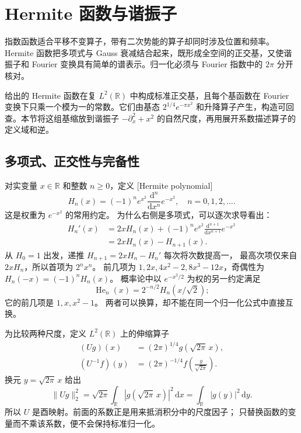 \section{Hermite 函数与谐振子}
\label{b2:sec:B201}

指数函数适合平移不变算子，带有二次势能的算子却同时涉及位置和频率。Hermite 函数把多项式与 Gauss 衰减结合起来，既形成全空间的正交基，又使谐振子和 Fourier 变换具有简单的谱表示。归一化必须与 Fourier 指数中的 \(2\pi\) 分开核对。

\ProseParagraphBreak
{}给出的 Hermite 函数在复 \(L^2(\mathbb R)\) 中构成标准正交基，且每个基函数在 Fourier 变换下只乘一个模为一的常数。它们由基态 \(2^{1/4}e^{-\pi x^2}\) 和升降算子产生，构造可回查。本节将这组基缩放到谐振子 \(-\partial_x^2+x^2\) 的自然尺度，再用展开系数描述算子的定义域和逆。

\subsection{多项式、正交性与完备性}
\label{b2:subsec:B20101}

对实变量 \(x\in\mathbb R\) 和整数 \(n\ge0\)，定义 [Hermite polynomial]
\[
 H_n(x)=(-1)^ne^{x^2}
 \frac{\mathrm d^n}{\mathrm dx^n}e^{-x^2},
 \quad n=0,1,2,\ldots.
\]
这是权重为 \(e^{-x^2}\) 的常用约定。
为什么右侧是多项式，可以逐次求导看出：
\[
 \begin{aligned}
 H_n'(x)
 &=2xH_n(x)+(-1)^ne^{x^2}
 \frac{\mathrm d^{n+1}}{\mathrm dx^{n+1}}e^{-x^2}\\
 &=2xH_n(x)-H_{n+1}(x).
 \end{aligned}
\]
从 \(H_0=1\) 出发，递推 \(H_{n+1}=2xH_n-H_n'\) 每次将次数提高一，
最高次项仅来自 \(2xH_n\)，所以首项为 \(2^nx^n\)。
前几项为 \(1,2x,4x^2-2,8x^3-12x\)，奇偶性为
\(H_n(-x)=(-1)^nH_n(x)\)。
概率论中以 \(e^{-x^2/2}\) 为权的另一约定满足
\[
 \operatorname{He}_n(x)=2^{-n/2}H_n(x/\sqrt2);
\]
它的前几项是 \(1,x,x^2-1\)。
两者可以换算，却不能在同一个归一化公式中直接互换。

\ProseParagraphBreak
为比较两种尺度，定义 \(L^2(\mathbb R)\) 上的伸缩算子
\begin{equation}\label{b2:eq:B2-hermite-dilation}
 \begin{aligned}
 (Ug)(x)&=(2\pi)^{1/4}g(\sqrt{2\pi}\,x),\\
 (U^{-1}f)(y)&=(2\pi)^{-1/4}
 f\left(\frac{y}{\sqrt{2\pi}}\right).
 \end{aligned}
\end{equation}
换元 \(y=\sqrt{2\pi}\,x\) 给出
\[
 \|Ug\|_2^2
 =\sqrt{2\pi}\int_{\mathbb R}|g(\sqrt{2\pi}\,x)|^2\,\mathrm dx
 =\int_{\mathbb R}|g(y)|^2\,\mathrm dy.
\]
所以 \(U\) 是酉映射。前面的系数正是用来抵消积分中的尺度因子；
只替换函数的变量而不乘该系数，便不会保持标准归一化。

